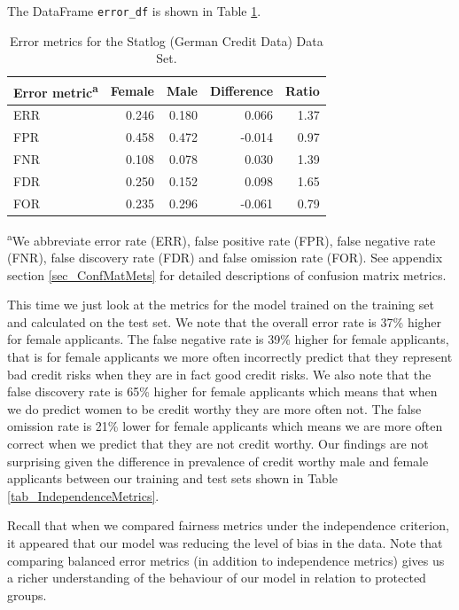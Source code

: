 %
The DataFrame \texttt{error\_df} is shown in Table \ref{tab_BalancedErrorMetrics}.
%
\begin{table}[h!]
{\centering
\caption{Error metrics for the Statlog (German Credit Data) Data Set.}
\label{tab_BalancedErrorMetrics}
\vspace{10pt}
\begin{tabular}{|l|r|r|r|r|}
\hline
Error metric\textsuperscript{a} & Female & Male & Difference & Ratio \\
\hline
\hline
ERR & 0.246 & 0.180 &  0.066 & 1.37 \\
\hline
FPR & 0.458 & 0.472 & -0.014 & 0.97 \\
FNR & 0.108 & 0.078 &  0.030 & 1.39 \\
FDR & 0.250 & 0.152 &  0.098 & 1.65 \\
FOR & 0.235 & 0.296 & -0.061 & 0.79 \\
\hline
\end{tabular}\par}
\vspace{4pt}
\footnotesize
\hspace{1.5em}\textsuperscript{a}We abbreviate error rate (ERR), false positive rate (FPR), false negative rate (FNR), false discovery rate (FDR) and false omission rate (FOR). See appendix section \ref{sec_ConfMatMets} for detailed descriptions of confusion matrix metrics.
\end{table}
%
This time we just look at the metrics for the model trained on the training set and calculated on the test set. We note that the overall error rate is 37\% higher for female applicants. The false negative rate is 39\% higher for female applicants, that is for female applicants we more often incorrectly predict that they represent bad credit risks when they are in fact good credit risks. We also note that the false discovery rate is 65\% higher for female applicants which means that when we do predict women to be credit worthy they are more often not. The false omission rate is 21\% lower for female applicants which means we are more often correct when we predict that they are not credit worthy. Our findings are not surprising given the difference in prevalence of credit worthy male and female applicants between our training and test sets shown in Table \ref{tab_IndependenceMetrics}.

Recall that when we compared fairness metrics under the independence criterion, it appeared that our model was reducing the level of bias in the data. Note that comparing balanced error metrics (in addition to independence metrics) gives us a richer understanding of the behaviour of our model in relation to protected groups.

